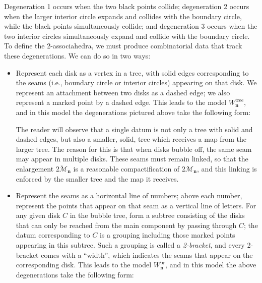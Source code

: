 \documentclass[11pt]{amsart}
\theoremstyle{definition}
\theoremstyle{remark}
\theoremstyle{plain}
\newcommand\cM{\mathcal{M}}
\newcommand\bn{\mathbf{n}}
\newcommand{\on}{\operatorname}
\newcommand{\tree}{{\on{tree}}}
\newcommand{\br}{{\on{br}}}
\newcommand{\ol}{\overline}
\begin{document}
\begin{figure}[H]
\centering
\def\svgwidth{0.4\columnwidth}

\end{figure}

\noindent
Degeneration 1 occurs when the two black points collide; degeneration 2 occurs when the larger interior circle expands and collides with the boundary circle, while the black points simultaneously collide; and degeneration 3 occurs when the two interior circles simultaneously expand and collide with the boundary circle.
To define the 2-associahedra, we must produce combinatorial data that track these degenerations.
We can do so in two ways:
\begin{itemize}
\item Represent each
disk
as a vertex in a tree, with solid edges corresponding to the seams (i.e., boundary circle or interior circles) appearing on that
disk.
We represent an attachment between two
disks
as a dashed edge; we also represent a marked point by a dashed edge.
This leads to the model $W_\bn^\tree$, and in this model the degenerations pictured above take the following form:

\begin{figure}[H]
\centering
\def\svgwidth{0.3\columnwidth}

\end{figure}

\noindent The reader will observe that a single datum is not only a tree with solid and dashed edges, but also a smaller, solid, tree which receives a map from the larger tree.
The reason for this is that when
disks
bubble off, the same seam may appear in multiple
disks.
These seams must remain linked, so that the enlargement $\ol{2\cM}_\bn$ is a reasonable compactification of $2\cM_\bn$, and this linking is enforced by the smaller tree and the map it receives.

\item Represent the seams as a horizontal line of numbers; above each number, represent the points that appear on that seam as a vertical line of letters.
For any given
disk
$C$ in the bubble tree, form a subtree consisting of the
disks
that can only be reached from the main component by passing through $C$; the datum corresponding to $C$ is a grouping including those marked points appearing in this subtree.
Such a grouping is called a {\it 2-bracket}, and every 2-bracket comes with a ``width'', which indicates the seams that appear on the corresponding
disk.
This leads to the model $W_\bn^\br$, and in this model the above degenerations take the following form:

\begin{figure}[H]
\centering
\def\svgwidth{0.35\columnwidth}

\end{figure}
\end{itemize}
\end{document}

